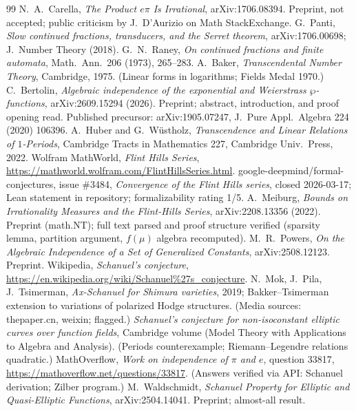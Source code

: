 \documentclass[11pt]{amsart}
\theoremstyle{definition}
\theoremstyle{remark}
\numberwithin{equation}{section}
\begin{document}
\begin{thebibliography}{99}
 N.~A.~Carella, \emph{The Product $e\pi$ Is Irrational}, arXiv:1706.08394. Preprint, not accepted; public criticism by J.~D'Aurizio on Math StackExchange.
 G.~Panti, \emph{Slow continued fractions, transducers, and the Serret theorem}, arXiv:1706.00698; J.~Number Theory (2018).
 G.~N.~Raney, \emph{On continued fractions and finite automata}, Math.~Ann.~206 (1973), 265--283.
 A.~Baker, \emph{Transcendental Number Theory}, Cambridge, 1975. (Linear forms in logarithms; Fields Medal 1970.)
 C.~Bertolin, \emph{Algebraic independence of the exponential and Weierstrass $\wp$-functions}, arXiv:2609.15294 (2026). Preprint; abstract, introduction, and proof opening read. Published precursor: arXiv:1905.07247, J.~Pure Appl.~Algebra 224 (2020) 106396.
 A.~Huber and G.~W\"ustholz, \emph{Transcendence and Linear Relations of $1$-Periods}, Cambridge Tracts in Mathematics 227, Cambridge Univ.~Press, 2022.
 Wolfram MathWorld, \emph{Flint Hills Series}, \url{https://mathworld.wolfram.com/FlintHillsSeries.html}.
 google-deepmind/formal-conjectures, issue \#3484, \emph{Convergence of the Flint Hills series}, closed 2026-03-17; Lean statement in repository; formalizability rating 1/5.
 A.~Meiburg, \emph{Bounds on Irrationality Measures and the Flint-Hills Series}, arXiv:2208.13356 (2022). Preprint (math.NT); full text parsed and proof structure verified (sparsity lemma, partition argument, $f(\mu)$ algebra recomputed).
 M.~R.~Powers, \emph{On the Algebraic Independence of a Set of Generalized Constants}, arXiv:2508.12123. Preprint.
 Wikipedia, \emph{Schanuel's conjecture}, \url{https://en.wikipedia.org/wiki/Schanuel\%27s_conjecture}.
 N.~Mok, J.~Pila, J.~Tsimerman, \emph{Ax-Schanuel for Shimura varieties}, 2019; Bakker--Tsimerman extension to variations of polarized Hodge structures. (Media sources: thepaper.cn, weixin; flagged.)
 \emph{Schanuel's conjecture for non-isoconstant elliptic curves over function fields}, Cambridge volume (Model Theory with Applications to Algebra and Analysis). (Periods counterexample; Riemann--Legendre relations quadratic.)
 MathOverflow, \emph{Work on independence of $\pi$ and $e$}, question 33817, \url{https://mathoverflow.net/questions/33817}. (Answers verified via API: Schanuel derivation; Zilber program.)
 M.~Waldschmidt, \emph{Schanuel Property for Elliptic and Quasi-Elliptic Functions}, arXiv:2504.14041. Preprint; almost-all result.

\end{thebibliography}
\end{document}
